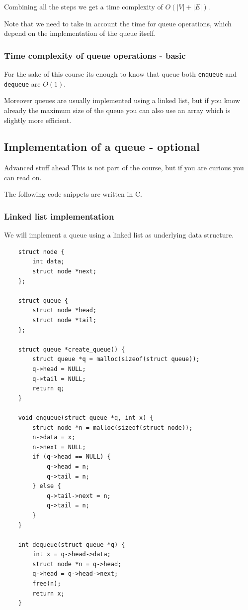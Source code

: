 \documentclass[12pt]{extarticle}
\begin{document}
Combining all the steps we get a time complexity of $O(|V| + |E|)$.

Note that we need to take in account the time for queue operations, which depend on the implementation of the queue itself.

\subsubsection{Time complexity of queue operations - basic}

For the sake of this course its enough to know that queue both \texttt{enqueue} and \texttt{dequeue} are $O(1)$.

Moreover queues are usually implemented using a linked list, but if you know already the maximum size of the queue you can also use an array which is slightly more efficient.

\subsection{Implementation of a queue - optional}

\begin{warningbox}{Advanced stuff ahead}
    This is not part of the course, but if you are curious you can read on.

    The following code snippets are written in C.
\end{warningbox}

\subsubsection{Linked list implementation}

We will implement a queue using a linked list as underlying data structure.

\begin{verbatim}
    struct node {
        int data;
        struct node *next;
    };

    struct queue {
        struct node *head;
        struct node *tail;
    };

    struct queue *create_queue() {
        struct queue *q = malloc(sizeof(struct queue));
        q->head = NULL;
        q->tail = NULL;
        return q;
    }

    void enqueue(struct queue *q, int x) {
        struct node *n = malloc(sizeof(struct node));
        n->data = x;
        n->next = NULL;
        if (q->head == NULL) {
            q->head = n;
            q->tail = n;
        } else {
            q->tail->next = n;
            q->tail = n;
        }
    }

    int dequeue(struct queue *q) {
        int x = q->head->data;
        struct node *n = q->head;
        q->head = q->head->next;
        free(n);
        return x;
    }
\end{verbatim}
\end{document}
